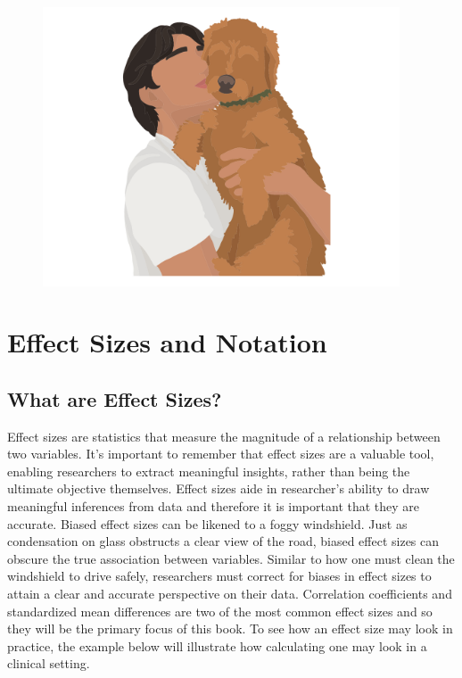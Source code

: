 \documentclass[
  letterpaper,
  DIV=11,
  numbers=noendperiod]{scrreprt}
\begin{document}
\begin{figure}

{\centering \includegraphics[width=4.16667in,height=\textheight]{figure/dedication_2.png}

}

\end{figure}


\hypertarget{effect-sizes-and-notation}{%
\chapter{Effect Sizes and Notation}\label{effect-sizes-and-notation}}

\hypertarget{what-are-effect-sizes}{%
\section{What are Effect Sizes?}\label{what-are-effect-sizes}}

Effect sizes are statistics that measure the magnitude of a relationship
between two variables. It's important to remember that effect sizes are
a valuable tool, enabling researchers to extract meaningful insights,
rather than being the ultimate objective themselves. Effect sizes aide
in researcher's ability to draw meaningful inferences from data and
therefore it is important that they are accurate. Biased effect sizes
can be likened to a foggy windshield. Just as condensation on glass
obstructs a clear view of the road, biased effect sizes can obscure the
true association between variables. Similar to how one must clean the
windshield to drive safely, researchers must correct for biases in
effect sizes to attain a clear and accurate perspective on their data.
Correlation coefficients and standardized mean differences are two of
the most common effect sizes and so they will be the primary focus of
this book. To see how an effect size may look in practice, the example
below will illustrate how calculating one may look in a clinical
setting.
\end{document}
